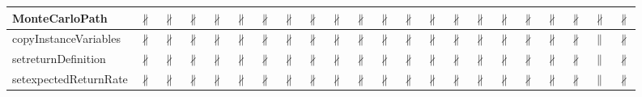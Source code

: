 \documentclass[10pt]{article}
\begin{document}
\begin{longtable}{|l|l|l|l|l|l|l|l|l|l|l|l|l|l|l|l|l|l|l|l|l|l|}
\hline
MonteCarloPath&{\color{BrickRed}$\nparallel$}&{\color{BrickRed}$\nparallel$}&{\color{BrickRed}$\nparallel$}&{\color{BrickRed}$\nparallel$}&{\color{BrickRed}$\nparallel$}&{\color{BrickRed}$\nparallel$}&{\color{BrickRed}$\nparallel$}&{\color{BrickRed}$\nparallel$}&{\color{BrickRed}$\nparallel$}&{\color{BrickRed}$\nparallel$}&{\color{BrickRed}$\nparallel$}&{\color{BrickRed}$\nparallel$}&{\color{BrickRed}$\nparallel$}&{\color{BrickRed}$\nparallel$}&{\color{BrickRed}$\nparallel$}&{\color{BrickRed}$\nparallel$}&{\color{BrickRed}$\nparallel$}&{\color{BrickRed}$\nparallel$}&{\color{BrickRed}$\nparallel$}&{\color{BrickRed}$\nparallel$}&{\color{BrickRed}$\nparallel$}\\
\hline
copyInstanceVariables&{\color{BrickRed}$\nparallel$}&{\color{BrickRed}$\nparallel$}&{\color{BrickRed}$\nparallel$}&{\color{BrickRed}$\nparallel$}&{\color{BrickRed}$\nparallel$}&{\color{BrickRed}$\nparallel$}&{\color{BrickRed}$\nparallel$}&{\color{BrickRed}$\nparallel$}&{\color{BrickRed}$\nparallel$}&{\color{BrickRed}$\nparallel$}&{\color{BrickRed}$\nparallel$}&{\color{BrickRed}$\nparallel$}&{\color{BrickRed}$\nparallel$}&{\color{BrickRed}$\nparallel$}&{\color{BrickRed}$\nparallel$}&{\color{BrickRed}$\nparallel$}&{\color{BrickRed}$\nparallel$}&{\color{BrickRed}$\nparallel$}&{\color{BrickRed}$\nparallel$}&{\color{blue}$\parallel$}&{\color{BrickRed}$\nparallel$}\\
\hline
setreturnDefinition&{\color{BrickRed}$\nparallel$}&{\color{BrickRed}$\nparallel$}&{\color{BrickRed}$\nparallel$}&{\color{BrickRed}$\nparallel$}&{\color{BrickRed}$\nparallel$}&{\color{BrickRed}$\nparallel$}&{\color{BrickRed}$\nparallel$}&{\color{BrickRed}$\nparallel$}&{\color{BrickRed}$\nparallel$}&{\color{BrickRed}$\nparallel$}&{\color{BrickRed}$\nparallel$}&{\color{BrickRed}$\nparallel$}&{\color{BrickRed}$\nparallel$}&{\color{BrickRed}$\nparallel$}&{\color{BrickRed}$\nparallel$}&{\color{BrickRed}$\nparallel$}&{\color{BrickRed}$\nparallel$}&{\color{BrickRed}$\nparallel$}&{\color{BrickRed}$\nparallel$}&{\color{blue}$\parallel$}&{\color{BrickRed}$\nparallel$}\\
\hline
setexpectedReturnRate&{\color{BrickRed}$\nparallel$}&{\color{BrickRed}$\nparallel$}&{\color{BrickRed}$\nparallel$}&{\color{BrickRed}$\nparallel$}&{\color{BrickRed}$\nparallel$}&{\color{BrickRed}$\nparallel$}&{\color{BrickRed}$\nparallel$}&{\color{BrickRed}$\nparallel$}&{\color{BrickRed}$\nparallel$}&{\color{BrickRed}$\nparallel$}&{\color{BrickRed}$\nparallel$}&{\color{BrickRed}$\nparallel$}&{\color{BrickRed}$\nparallel$}&{\color{BrickRed}$\nparallel$}&{\color{BrickRed}$\nparallel$}&{\color{BrickRed}$\nparallel$}&{\color{BrickRed}$\nparallel$}&{\color{BrickRed}$\nparallel$}&{\color{BrickRed}$\nparallel$}&{\color{blue}$\parallel$}&{\color{BrickRed}$\nparallel$}\\

\end{longtable}
\end{document}
